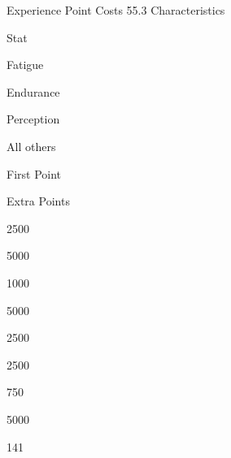\begin{Chapter}{Experience Point Costs}
55.3 Characteristics 

Stat 

Fatigue 

Endurance 

Perception 

All others 

 

First Point 

Extra Points  

2500 

5000 

1000 

5000 

2500  

2500  

750  

5000  

 

141 
\end{Chapter}
